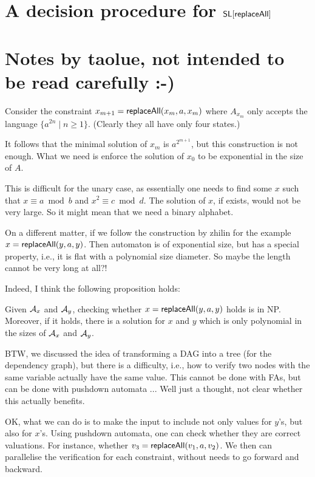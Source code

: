 \documentclass{llncs}
\begin{document}
\section{A decision procedure for $\mathsf{SL}[\mathsf{replaceAll}]$}






\appendix

\section{Notes by taolue, not intended to be read carefully :-)}

Consider the constraint $x_{m+1}=\mathsf{replaceAll}(x_m,a,x_m)$ where $A_{x_m}$ only accepts the language $\{a^{2n}\mid n\geq 1\}$. (Clearly they all have only four states.)

It follows that the minimal solution of $x_m$ is $a^{2^{m+1}}$, but this construction is not enough. What we need is enforce the solution of $x_0$ to be exponential in the size of $A$. 

This is difficult for the unary case, as essentially one needs to find some $x$ such that $x\equiv a \bmod b$ and $x^2 \equiv c\bmod d$. The solution of $x$, if exists, would not be very large. So it might mean that we need a binary alphabet. 

On a different matter, if we follow the construction by zhilin for the example $x=\mathsf{replaceAll}(y,a,y)$. Then automaton is of exponential size, but has a special property, i.e., it is flat with a polynomial size diameter. So maybe the length cannot be very long at all?!

Indeed, I think the following proposition holds:
\begin{proposition}
	Given $\mathcal{A}_x$ and $\mathcal{A}_y$, checking whether $x=\mathsf{replaceAll}(y,a,y)$ holds is in NP. Moreover, if it holds, there is a solution for $x$ and $y$ which is only polynomial in the sizes of $\mathcal{A}_x$ and $\mathcal{A}_y$. 
\end{proposition}	

BTW, we discussed the idea of transforming a DAG into a tree (for the dependency graph), but there is a difficulty, i.e., how to verify two nodes with the same variable actually have the same value. This cannot be done with FAs, but can be done with pushdown automata ... Well just a thought, not clear whether this actually benefits. 

OK, what we can do is to make the input to include not only values for $y$'s, but also for $x$'s. Using pushdown automata, one can check whether they are correct valuations. For instance, whether $v_3=\mathsf{replaceAll}(v_1, a,v_2)$. We then can parallelise the verification for each constraint, without needs to go forward and backward.  
\end{document}
